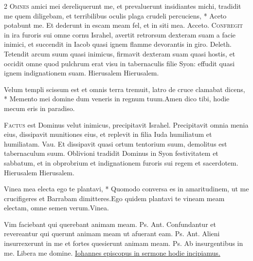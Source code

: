 \begin{multicols*}{2}
\lettrine[lines=2]{\zallmancaps \color{Blue} O}{mnes} \hypertarget{omnes-amici}{\label{omnes-amici}} amici mei dereliquerunt me, et prevaluerunt insidiantes michi, tradidit me quem diligebam, et terribilibus oculis plaga crudeli percuciens, * Aceto potabunt me. \V Et dederunt in escam meam fel, et in siti mea. Acceto.
\lettrine[lines=2]{\zallmancaps \color{Red} C}{onfregit} in ira furoris sui omne cornu Israhel, avertit retrorsum dexteram suam a facie inimici, et succendit in Iacob quasi ignem flamme devorantis in giro. {\color{Red} Deleth.} Tetendit arcum suum quasi inimicus, firmavit dexteram suam quasi hostis, et occidit omne quod pulchrum erat visu in tabernaculis filie Syon: effudit quasi ignem indignationem suam. Hierusalem Hierusalem.
\begin{responsory}
{Velum templi scissum est et omnis terra tremuit, latro de cruce clamabat dicens, * Memento mei domine dum veneris in regnum tuum.}{Amen dico tibi, hodie mecum eris in paradiso.}
\end{responsory}%
\lettrine[lines=2]{\zallmancaps \color{Blue} F}{actus} est Dominus velut inimicus, precipitavit Israhel. Precipitavit omnia menia eius, dissipavit munitiones eius, et replevit in filia Iuda humiliatum et humiliatam. {\color{Red} Vau.} Et dissipavit quasi ortum tentorium suum, demolitus est tabernaculum suum. Oblivioni tradidit Dominus in Syon festivitatem et sabbatum, et in obprobrium et indignationem furoris sui regem et sacerdotem. Hierusalem Hierusalem.
\begin{responsory}
{Vinea mea electa ego te plantavi, * Quomodo conversa es in amaritudinem, ut me crucifigeres et Barrabam dimitteres.}{Ego quidem plantavi te vineam meam electam, omne semen verum.}Vinea.
\end{responsory}%
 Vim faciebant qui querebant animam meam. {\color{Red} Ps.}  {\color{Red} Ant.} Confundantur et revereantur qui querunt animam meam ut afuerant eam. {\color{Red} Ps.}  {\color{Red} Ant.} Alieni insurrexerunt in me et fortes quesierunt animam meam. {\color{Red} Ps.}  \V Ab insurgentibus in me. \R Libera me domine.
\newline \ul{Iohannes episcopus in sermone hodie incipiamus.} \grecross

\end{multicols*}
